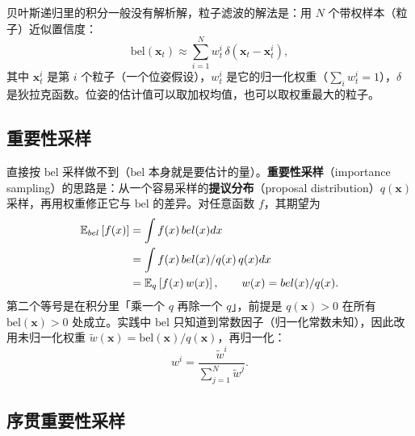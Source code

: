 贝叶斯递归里的积分一般没有解析解，粒子滤波的解法是：用 $N$ 个带权样本（粒子）近似置信度：
\begin{equation}
  \mathrm{bel}(\bm{x}_t) \approx \sum_{i=1}^{N} w_t^{i}\,\delta\left(\bm{x}_t-\bm{x}_t^{i}\right),
  \label{eq:10-particles}
\end{equation}
其中 $\bm{x}_t^{i}$ 是第 $i$ 个粒子（一个位姿假设），$w_t^{i}$ 是它的归一化权重（$\sum_i w_t^i=1$），$\delta$ 是狄拉克函数。位姿的估计值可以取加权均值，也可以取权重最大的粒子。

\subsection{重要性采样}

直接按 $\mathrm{bel}$ 采样做不到（$\mathrm{bel}$ 本身就是要估计的量）。\textbf{重要性采样}（importance sampling）的思路是：从一个容易采样的\textbf{提议分布}（proposal distribution）$q(\bm{x})$ 采样，再用权重修正它与 $\mathrm{bel}$ 的差异。对任意函数 $f$，其期望为
\begin{align}
  \mathbb{E}_{bel}\left[f(x)\right]
  &= \int f(x)\,bel(x)dx \notag\\
  &= \int f(x)\,bel(x)/q(x)\,q(x)dx \notag\\
  &= \mathbb{E}_{q}\left[f(x)\,w(x)\right],
  \qquad
  w(x) = bel(x)/q(x).
  \label{eq:10-is}
\end{align}
第二个等号是在积分里「乘一个 $q$ 再除一个 $q$」，前提是 $q(\bm{x})>0$ 在所有 $\mathrm{bel}(\bm{x})>0$ 处成立。实践中 $\mathrm{bel}$ 只知道到常数因子（归一化常数未知），因此改用未归一化权重 $\tilde{w}(\bm{x})=\mathrm{bel}(\bm{x})/q(\bm{x})$，再归一化：
\begin{equation}
  w^{i} = \frac{\tilde{w}^{i}}{\sum_{j=1}^{N}\tilde{w}^{j}}.
  \label{eq:10-w-normalize}
\end{equation}

\subsection{序贯重要性采样}

